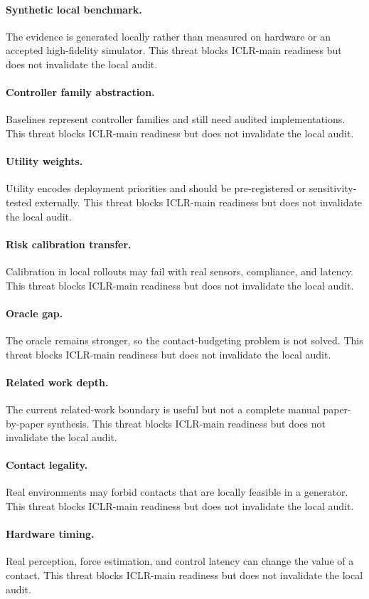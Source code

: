 \documentclass{article}
\begin{document}
\paragraph{Synthetic local benchmark.} The evidence is generated locally rather than measured on hardware or an accepted high-fidelity simulator. This threat blocks ICLR-main readiness but does not invalidate the local audit.
\paragraph{Controller family abstraction.} Baselines represent controller families and still need audited implementations. This threat blocks ICLR-main readiness but does not invalidate the local audit.
\paragraph{Utility weights.} Utility encodes deployment priorities and should be pre-registered or sensitivity-tested externally. This threat blocks ICLR-main readiness but does not invalidate the local audit.
\paragraph{Risk calibration transfer.} Calibration in local rollouts may fail with real sensors, compliance, and latency. This threat blocks ICLR-main readiness but does not invalidate the local audit.
\paragraph{Oracle gap.} The oracle remains stronger, so the contact-budgeting problem is not solved. This threat blocks ICLR-main readiness but does not invalidate the local audit.
\paragraph{Related work depth.} The current related-work boundary is useful but not a complete manual paper-by-paper synthesis. This threat blocks ICLR-main readiness but does not invalidate the local audit.
\paragraph{Contact legality.} Real environments may forbid contacts that are locally feasible in a generator. This threat blocks ICLR-main readiness but does not invalidate the local audit.
\paragraph{Hardware timing.} Real perception, force estimation, and control latency can change the value of a contact. This threat blocks ICLR-main readiness but does not invalidate the local audit.
\clearpage
\end{document}
